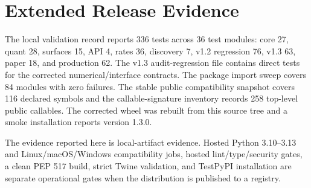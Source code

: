 \documentclass{asrpaper}
\begin{document}
\section{Extended Release Evidence}
The local validation record reports 336 tests across 36 test modules: core 27, quant 28, surfaces 15, API 4, rates 36, discovery 7, v1.2 regression 76, v1.3 63, paper 18, and production 62. The v1.3 audit-regression file contains direct tests for the corrected numerical/interface contracts. The package import sweep covers 84 modules with zero failures. The stable public compatibility snapshot covers 116 declared symbols and the callable-signature inventory records 258 top-level public callables. The corrected wheel was rebuilt from this source tree and a smoke installation reports version 1.3.0.

The evidence reported here is local-artifact evidence. Hosted Python 3.10--3.13 and Linux/macOS/Windows compatibility jobs, hosted lint/type/security gates, a clean PEP 517 build, strict Twine validation, and TestPyPI installation are separate operational gates when the distribution is published to a registry.
\end{document}
